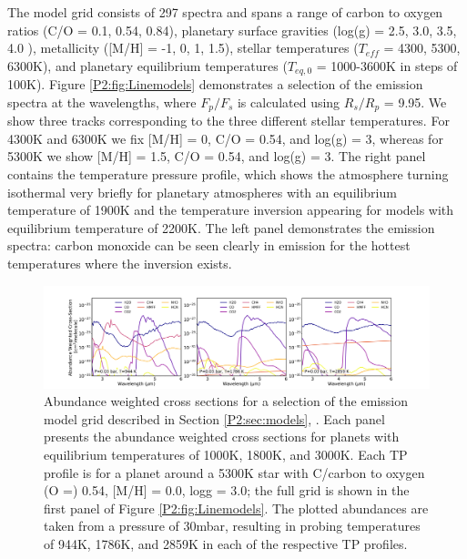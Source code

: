 The model grid consists of 297 spectra and spans a range of carbon to oxygen ratios (C/O = 0.1, 0.54, 0.84), planetary surface gravities (log(g) = 2.5, 3.0, 3.5, 4.0 ), metallicity ([M/H] = -1, 0, 1, 1.5), stellar temperatures ($T_{eff}$ = 4300, 5300, 6300K), and planetary equilibrium temperatures ($T_{eq,\textit{0}}$ = 1000-3600K in steps of 100K).
Figure \ref{P2:fig:Linemodels} demonstrates a selection of the emission spectra at the \spitzer wavelengths, where $F_p/F_s$ is calculated using $R_s/R_p$ = 9.95. We show three tracks corresponding to the three different stellar temperatures. For 4300K and 6300K we fix [M/H] = 0, C/O = 0.54, and log(g) = 3, whereas for 5300K we show [M/H] = 1.5, C/O = 0.54, and log(g) = 3. The right panel contains the temperature pressure profile, which shows the atmosphere turning isothermal very briefly for planetary atmospheres with an equilibrium temperature of 1900K and the temperature inversion appearing for models with equilibrium temperature of 2200K. The left panel demonstrates the emission spectra: carbon monoxide can be seen clearly in emission for the hottest temperatures where the inversion exists.

\begin{figure}
    \centering
    \includegraphics[trim={2cm 0 3cm 0},clip,width=\linewidth]{opacities.pdf}
    \caption{Abundance weighted cross sections for a selection of the emission model grid described in Section \ref{P2:sec:models}, \citep{Piskorz2018}. Each panel presents the abundance weighted cross sections for planets with equilibrium temperatures of 1000K, 1800K, and 3000K. Each TP profile is for a planet around a 5300K star with C/carbon to oxygen (O =) 0.54, [M/H] = 0.0, logg = 3.0; the full grid is shown in the first panel of Figure \ref{P2:fig:Linemodels}. The plotted abundances are taken from a pressure of 30mbar, resulting in probing temperatures of 944K, 1786K, and 2859K in each of the respective TP profiles.}
    \label{P2:fig:opacities}
\end{figure}

